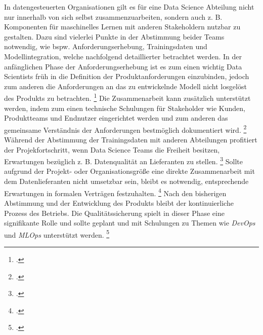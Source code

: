 In datengesteuerten Organisationen gilt es für eine Data Science Abteilung nicht nur innerhalb von sich selbst zusammenzuarbeiten, sondern auch z. B. Komponenten für maschinelles Lernen mit anderen Stakeholdern nutzbar zu gestalten.
Dazu sind vielerlei Punkte in der Abstimmung beider Teams notwendig, wie bspw. Anforderungserhebung, Trainingsdaten und Modellintegration, welche nachfolgend detaillierter betrachtet werden.
In der anfänglichen Phase der Anforderungserhebung ist es zum einen wichtig Data Scientists früh in die Definition der Produktanforderungen einzubinden, jedoch zum anderen die Anforderungen an das zu entwickelnde Modell nicht losgelöst des Produkts zu betrachten. \footcite[prenote][postnote]{involving data scientists for product requirement}
Die Zusammenarbeit kann zusätzlich unterstützt werden, indem zum einen technische Schulungen für Stakeholder wie Kunden, Produktteams und Endnutzer eingerichtet werden und zum anderen das gemeinsame Verständnis der Anforderungen bestmöglich dokumentiert wird. \footcite[prenote][postnote]{technical trainings, more formal requirements}
Während der Abstimmung der Trainingsdaten mit anderen Abteilungen profitiert der Projekfortschritt, wenn Data Science Teams die Freiheit besitzen, Erwartungen bezüglich z. B. Datenqualität an Lieferanten zu stellen. \footcite[prenote][postnote]{model teams neet to set data expectations}
Sollte aufgrund der Projekt- oder Organisationsgröße eine direkte Zusammenarbeit mit dem Datenlieferanten nicht umsetzbar sein, bleibt es notwendig, entsprechende Erwartungen in formalen Verträgen festzuhalten. \footcite[prenote][postnote]{smaller organizations}
Nach den bisherigen Abstimmung und der Entwicklung des Produkts bleibt der kontinuierliche Prozess des Betriebs.
Die Qualitätssicherung spielt in dieser Phase eine signifikante Rolle und sollte geplant und mit Schulungen zu Themen wie \textit{DevOps} und \textit{MLOps} unterstützt werden. \footcite[prenote][postnote]{quality assurance}